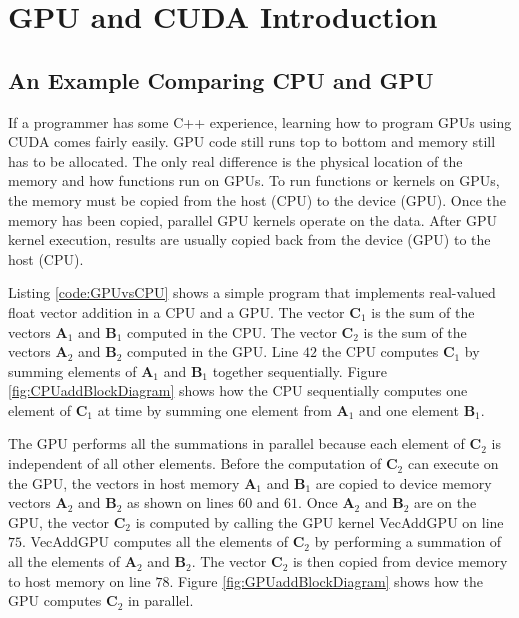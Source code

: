 \section{GPU and CUDA Introduction}
\subsection{An Example Comparing CPU and GPU}
If a programmer has some C++ experience, learning how to program GPUs using CUDA comes fairly easily.
GPU code still runs top to bottom and memory still has to be allocated.
The only real difference is the physical location of the memory and how functions run on GPUs.
To run functions or kernels on GPUs, the memory must be copied from the host (CPU) to the device (GPU).
Once the memory has been copied, parallel GPU kernels operate on the data.
After GPU kernel execution, results are usually copied back from the device (GPU) to the host (CPU).

Listing \ref{code:GPUvsCPU} shows a simple program that implements real-valued float vector addition in a CPU and a GPU.
The vector $\mathbf{C}_1$ is the sum of the vectors $\mathbf{A}_1$ and $\mathbf{B}_1$ computed in the CPU.
The vector $\mathbf{C}_2$ is the sum of the vectors $\mathbf{A}_2$ and $\mathbf{B}_2$ computed in the GPU.
Line $42$ the CPU computes $\mathbf{C}_1$ by summing elements of $\mathbf{A}_1$ and $\mathbf{B}_1$ together sequentially. Figure \ref{fig:CPUaddBlockDiagram} shows how the CPU 
sequentially computes one element of $\mathbf{C}_1$ at time by summing one element from $\mathbf{A}_1$ and one element $\mathbf{B}_1$.

The GPU performs all the summations in parallel because each element of $\mathbf{C}_2$ is independent of all other elements. 
Before the computation of $\mathbf{C}_2$ can execute on the GPU, the vectors in host memory $\mathbf{A}_1$ and $\mathbf{B}_1$ are copied to device memory vectors $\mathbf{A}_2$ and $\mathbf{B}_2$ as shown on lines $60$ and $61$.
Once $\mathbf{A}_2$ and $\mathbf{B}_2$ are on the GPU, the vector $\mathbf{C}_2$ is computed by calling the GPU kernel VecAddGPU on line $75$.
VecAddGPU computes all the elements of $\mathbf{C}_2$ by performing a summation of all the elements of $\mathbf{A}_2$ and $\mathbf{B}_2$.
The vector $\mathbf{C}_2$ is then copied from device memory to host memory on line $78$.
Figure \ref{fig:GPUaddBlockDiagram} shows how the GPU computes $\mathbf{C}_2$ in parallel.

